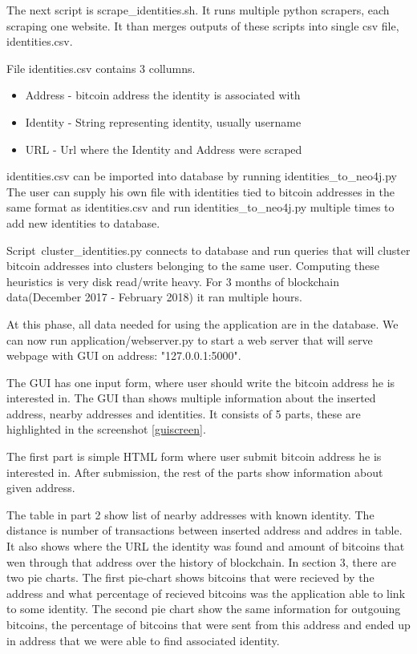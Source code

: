 \documentclass[
  digital, %
  table,   %
  lof,     %
  lot,     %
  oneside
]{fithesis3}
\begin{document}
\begin{appendices}
The next script is scrape\_identities.sh. It runs multiple python scrapers, each scraping one website.
It than merges outputs of these scripts into single csv file, identities.csv.

File identities.csv contains 3 collumns.
\begin{itemize}
  \item Address - bitcoin address the identity is associated with
  \item Identity - String representing identity, usually username
  \item URL - Url where the Identity and Address were scraped
\end{itemize}

identities.csv can be imported into database by running identities\_to\_neo4j.py
The user can supply his own file with identities tied to bitcoin addresses in the same format as identities.csv and 
run identities\_to\_neo4j.py multiple times to add new identities to database.

Script\ cluster\_identities.py connects to database and run queries that will cluster bitcoin addresses into
clusters belonging to the same user. Computing these heuristics is very disk read/write heavy.
For 3 months of blockchain data(December 2017 - February 2018) it ran multiple hours.

At this phase, all data needed for using the application are in the database. We can now run application/webserver.py
to start a web server that will serve webpage with GUI on address: "127.0.0.1:5000".

The GUI has one input form, where user should write the bitcoin address he is interested in.
The GUI than shows multiple information about the inserted address, nearby addresses and identities.
It consists of 5 parts, these are highlighted in the screenshot \ref{guiscreen}.

The first part is simple HTML form where user submit bitcoin address he is interested in.
After submission, the rest of the parts show information about given address.

The table in part 2 show list of nearby addresses with known identity. The distance is number of transactions
between inserted address and addres in table. It also shows where the URL the identity was found
and amount of bitcoins that wen through that address over the history of blockchain.
In section 3, there are two pie charts. The first pie-chart shows bitcoins that were recieved by the address
and what percentage of recieved bitcoins was the application able to link to some identity.
The second pie chart show the same information for outgouing bitcoins, the percentage of bitcoins that were sent from this address
and ended up in address that we were able to find associated identity.


\end{appendices}
\end{document}
